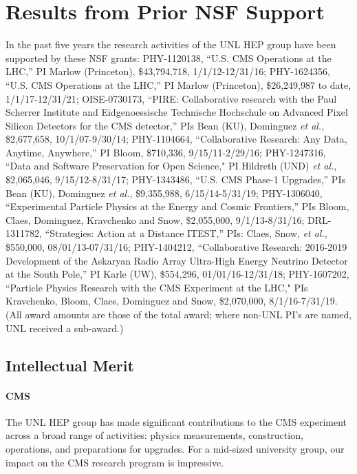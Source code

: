 \section{Results from Prior NSF Support}
\label{sec:prior}

In the past five years the research activities of the UNL HEP group have been supported by these NSF grants: 
PHY-1120138, ``U.S. CMS Operations at the LHC,'' PI Marlow (Princeton), \$43,794,718, 1/1/12-12/31/16; 
PHY-1624356, ``U.S. CMS Operations at the LHC,'' PI Marlow (Princeton), \$26,249,987 to date, 1/1/17-12/31/21; 
OISE-0730173, ``PIRE: Collaborative research with the Paul Scherrer Institute and Eidgenoessische Technische Hochschule on Advanced Pixel Silicon Detectors for the CMS detector,'' PIs Bean (KU), Dominguez {\it et al.}, \$2,677,658, 10/1/07-9/30/14; 
PHY-1104664, ``Collaborative Research: Any Data, Anytime, Anywhere,'' PI Bloom, \$710,336, 9/15/11-2/29/16;
PHY-1247316, ``Data and Software Preservation for Open Science," PI Hildreth (UND) {\it et al.}, \$2,065,046, 9/15/12-8/31/17;
PHY-1343486, ``U.S. CMS Phase-1 Upgrades,'' PIs Bean (KU), Dominguez {\it et al.}, \$9,355,988, 6/15/14-5/31/19;
PHY-1306040, ``Experimental Particle Physics at the Energy and Cosmic Frontiers,'' PIs Bloom, Claes, Dominguez, Kravchenko and Snow, \$2,055,000, 9/1/13-8/31/16;
DRL-1311782, ``Strategies: Action at a Distance ITEST,'' PIs: Claes, Snow, {\it et al.}, \$550,000, 08/01/13-07/31/16;
PHY-1404212, ``Collaborative Research: 2016-2019 Development of the Askaryan Radio Array Ultra-High Energy Neutrino Detector at the South Pole,'' PI Karle (UW), \$554,296, 01/01/16-12/31/18;
PHY-1607202, ``Particle Physics Research with the CMS Experiment at the LHC," PIs Kravchenko, Bloom, Claes, Dominguez and Snow, \$2,070,000, 8/1/16-7/31/19.
(All award amounts are those of the total award; where non-UNL PI's are named, UNL received a sub-award.)


\subsection{Intellectual Merit}

\paragraph{CMS}
The UNL HEP group has made significant contributions to the CMS experiment across a broad range of activities: physics measurements, construction, operations, and preparations for upgrades. 
For a mid-sized university group, our impact on the CMS research program is impressive.

